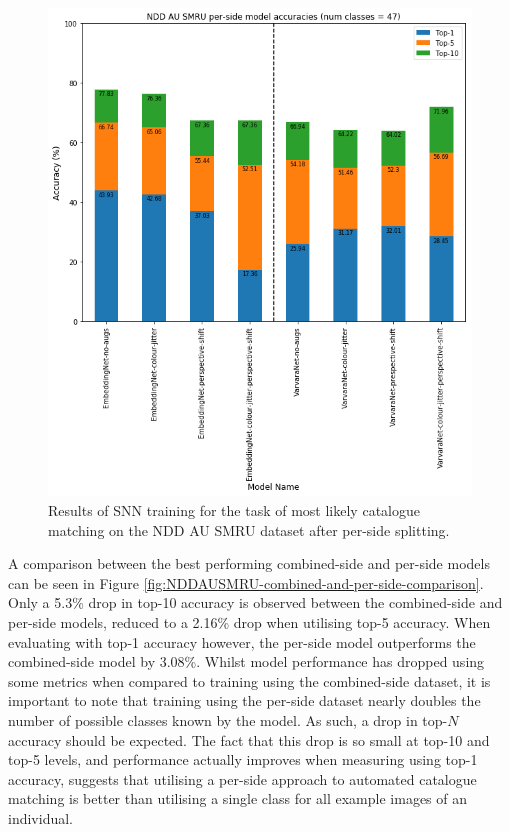 \begin{figure}[t]
	\begin{center}
		\includegraphics[scale=0.5]{Chapter5/figs/NDDAUSMRU-per-side-SNN-model-accuracies.png}
	\end{center}
	\caption{Results of SNN training for the task of most likely catalogue matching on the NDD AU SMRU dataset after per-side splitting.}
	\label{fig:NDDAUSMRU-per-side-SNN-model-accuracies}
\end{figure}

 A comparison between the best performing combined-side and per-side models can be seen in Figure \ref{fig:NDDAUSMRU-combined-and-per-side-comparison}. Only a 5.3\% drop in top-10 accuracy is observed between the combined-side and per-side models, reduced to a 2.16\% drop when utilising top-5 accuracy. When evaluating with top-1 accuracy however, the per-side model outperforms the combined-side model by 3.08\%. Whilst model performance has dropped using some metrics when compared to training using the combined-side dataset, it is important to note that training using the per-side dataset nearly doubles the number of possible classes known by the model. As such, a drop in top-$N$ accuracy should be expected. The fact that this drop is so small at top-10 and top-5 levels, and performance actually improves when measuring using top-1 accuracy, suggests that utilising a per-side approach to automated catalogue matching is better than utilising a single class for all example images of an individual.


